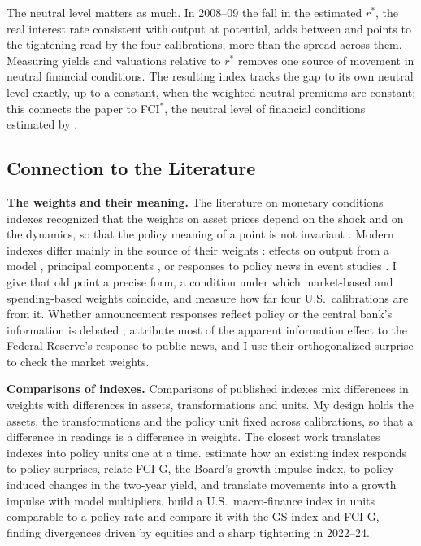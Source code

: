 The neutral level matters as much. In 2008--09 the fall in the estimated $r^*$, the real interest rate consistent with output at potential, adds between  and  points to the tightening read by the four calibrations, more than the spread across them. Measuring yields and valuations relative to $r^*$ removes one source of movement in neutral financial conditions. The resulting index tracks the gap to its own neutral level exactly, up to a constant, when the weighted neutral premiums are constant; this connects the paper to FCI$^*$, the neutral level of financial conditions estimated by \citet{caballero2026}.

\subsection{Connection to the Literature}
\textbf{The weights and their meaning.} The literature on monetary conditions indexes recognized that the weights on asset prices depend on the shock and on the dynamics, so that the policy meaning of a point is not invariant \citep{eika1996}. Modern indexes differ mainly in the source of their weights \citep{hatzius2010}: effects on output from a model \citep{dudley2000,hatzius2018,ajello2023}, principal components \citep{brave2011}, or responses to policy news in event studies \citep{kuttner2001,gurkaynak2005,bernanke2005,nakamura2018,bauer2023}. I give that old point a precise form, a condition under which market-based and spending-based weights coincide, and measure how far four U.S.\ calibrations are from it. Whether announcement responses reflect policy or the central bank's information is debated \citep{nakamura2018}; \citet{bauer2023aer} attribute most of the apparent information effect to the Federal Reserve's response to public news, and I use their orthogonalized surprise to check the market weights.

\textbf{Comparisons of indexes.} Comparisons of published indexes mix differences in weights with differences in assets, transformations and units. My design holds the assets, the transformations and the policy unit fixed across calibrations, so that a difference in readings is a difference in weights. The closest work translates indexes into policy units one at a time. \citet{arnaut2024} estimate how an existing index responds to policy surprises, \citet{sack2023} relate FCI-G, the Board's growth-impulse index, to policy-induced changes in the two-year yield, and \citet{ajello2023} translate movements into a growth impulse with model multipliers. \citet{bletzinger2026} build a U.S.\ macro-finance index in units comparable to a policy rate and compare it with the GS index and FCI-G, finding divergences driven by equities and a sharp tightening in 2022--24.

